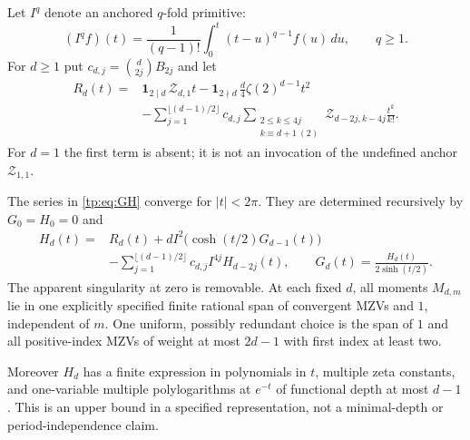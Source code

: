 Let $I^q$ denote an anchored $q$-fold primitive:
\begin{equation}\label{tp:eq:primitive}
 (I^qf)(t)=\frac1{(q-1)!}\int_0^t(t-u)^{q-1}f(u)\,du,
 \qquad q\geq1.
\end{equation}
For $d\geq1$ put $c_{d,j}=\binom d{2j}B_{2j}$ and let
\begin{equation}\label{tp:eq:anchorpoly}
 \begin{split}
 R_d(t)={}&\mathbf1_{2\mid d}\,\mathcal Z_{d,1}t
       -\mathbf1_{2\nmid d}\,\frac d4\zeta(2)^{d-1}t^2\\
 &-\sum_{j=1}^{\lfloor(d-1)/2\rfloor}c_{d,j}
       \sum_{\substack{2\leq k\leq4j\\k\equiv d+1\ (2)}}
         \mathcal Z_{d-2j,k-4j}\frac{t^k}{k!}.
 \end{split}
\end{equation}
For $d=1$ the first term is absent; it is not an invocation of the
undefined anchor $\mathcal Z_{1,1}$.

\begin{theorem}
\label{tp:thm:generator}
The series in \eqref{tp:eq:GH} converge for $|t|<2\pi$.  They are
determined recursively by $G_0=H_0=0$ and
\begin{equation}\label{tp:eq:generator}
 \boxed{\begin{aligned}
 H_d(t)={}&R_d(t)+dI^2\bigl(\cosh(t/2)G_{d-1}(t)\bigr)\\
 &-\sum_{j=1}^{\lfloor(d-1)/2\rfloor}c_{d,j}I^{4j}H_{d-2j}(t),
 \qquad G_d(t)=\frac{H_d(t)}{2\sinh(t/2)}.
 \end{aligned}}
\end{equation}
The apparent singularity at zero is removable.  At each fixed $d$,
all moments $M_{d,m}$ lie in one explicitly specified finite rational
span of convergent MZVs and $1$, independent of $m$.
One uniform, possibly redundant choice is the span of $1$ and all
positive-index MZVs of weight at most $2d-1$ with first index at least two.

Moreover $H_d$ has a finite expression in polynomials in $t$, multiple
zeta constants, and one-variable multiple polylogarithms at $e^{-t}$
of functional depth at most $d-1$.  This is an upper bound in a
specified representation, not a minimal-depth or period-independence claim.
\end{theorem}

